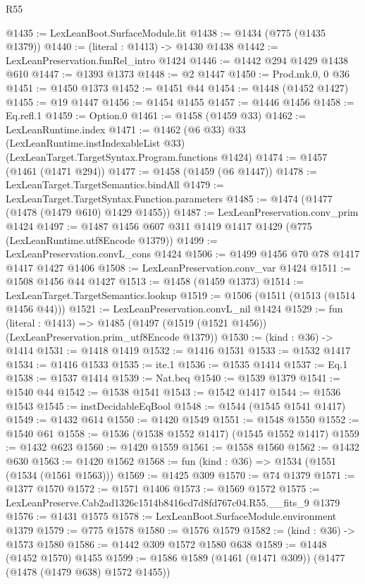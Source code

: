 \begin{lexlean}{R55}
\begin{coremodule}
{{@1435 := LexLeanBoot.SurfaceModule.lit
@1438 := @1434 (@775 (@1435 @1379))
@1440 := (literal : @1413) -> @1430 @1438
@1442 := LexLeanPreservation.funRel_intro @1424
@1446 := @1442 @294 @1429 @1438 @610
@1447 := @1393 @1373
@1448 := @2 @1447
@1450 := Prod.mk.{0, 0} @36
@1451 := @1450 @1373
@1452 := @1451 @44
@1454 := @1448 (@1452 @1427)
@1455 := @19 @1447
@1456 := @1454 @1455
@1457 := @1446 @1456
@1458 := Eq.refl.{1}
@1459 := Option.{0}
@1461 := @1458 (@1459 @33)
@1462 := LexLeanRuntime.index
@1471 := @1462
    (@6 @33)
    @33
    (LexLeanRuntime.instIndexableList @33)
    (LexLeanTarget.TargetSyntax.Program.functions @1424)
@1474 := @1457 (@1461 (@1471 @294))
@1477 := @1458 (@1459 (@6 @1447))
@1478 := LexLeanTarget.TargetSemantics.bindAll
@1479 := LexLeanTarget.TargetSyntax.Function.parameters
@1485 := @1474 (@1477 (@1478 (@1479 @610) @1429 @1455))
@1487 := LexLeanPreservation.conv_prim @1424
@1497 := @1487 @1456 @607 @311 @1419 @1417 @1429 (@775 (LexLeanRuntime.utf8Encode @1379))
@1499 := LexLeanPreservation.convL_cons @1424
@1506 := @1499 @1456 @70 @78 @1417 @1417 @1427 @1406
@1508 := LexLeanPreservation.conv_var @1424
@1511 := @1508 @1456 @44 @1427
@1513 := @1458 (@1459 @1373)
@1514 := LexLeanTarget.TargetSemantics.lookup
@1519 := @1506 (@1511 (@1513 (@1514 @1456 @44)))
@1521 := LexLeanPreservation.convL_nil @1424
@1529 := fun (literal : @1413) =>
  @1485 (@1497 (@1519 (@1521 @1456)) (LexLeanPreservation.prim_utf8Encode @1379))
@1530 := (kind : @36) -> @1414
@1531 := @1418 @1419
@1532 := @1416 @1531
@1533 := @1532 @1417
@1534 := @1416 @1533
@1535 := ite.{1}
@1536 := @1535 @1414
@1537 := Eq.{1}
@1538 := @1537 @1414
@1539 := Nat.beq
@1540 := @1539 @1379
@1541 := @1540 @44
@1542 := @1538 @1541
@1543 := @1542 @1417
@1544 := @1536 @1543
@1545 := instDecidableEqBool
@1548 := @1544 (@1545 @1541 @1417)
@1549 := @1432 @614
@1550 := @1420 @1549
@1551 := @1548 @1550
@1552 := @1540 @61
@1558 := @1536 (@1538 @1552 @1417) (@1545 @1552 @1417)
@1559 := @1432 @623
@1560 := @1420 @1559
@1561 := @1558 @1560
@1562 := @1432 @630
@1563 := @1420 @1562
@1568 := fun (kind : @36) => @1534 (@1551 (@1534 (@1561 @1563)))
@1569 := @1425 @309
@1570 := @74 @1379
@1571 := @1377 @1570
@1572 := @1571 @1406
@1573 := @1569 @1572
@1575 := LexLeanPreserve.Cab2ad1326c1514b8416cd7d8fd767c04.R55.__fits_9 @1379
@1576 := @1431 @1575
@1578 := LexLeanBoot.SurfaceModule.environment @1379
@1579 := @775 @1578
@1580 := @1576 @1579
@1582 := (kind : @36) -> @1573 @1580
@1586 := @1442 @309 @1572 @1580 @638
@1589 := @1448 (@1452 @1570) @1455
@1599 := @1586 @1589 (@1461 (@1471 @309)) (@1477 (@1478 (@1479 @638) @1572 @1455))
}}
\end{coremodule}
\end{lexlean}
